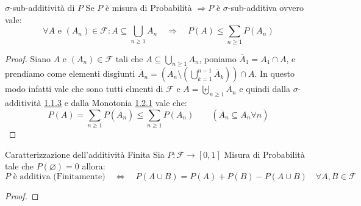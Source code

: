 \documentclass[11pt, a4paper, twoside]{article}
\begin{document}
\begin{prop}{$\sigma$-sub-additività di $P$}{}
	Se $P$ è misura di Probabilità	$\Rightarrow P$ è $\sigma$-sub-additiva ovvero vale:
	\[
		\forall A \text{ e } (A_n)\in\mathcal F : A\subseteq \bigcup\limits_{n\geq 1} A_n\quad\Rightarrow\quad P(A)\leq \sum\limits_{n\geq 1} P(A_n)
	\]
\end{prop}
\begin{proof}
	Siano $A$ e $(A_n)\in\mathcal F$ tali che $A\subseteq \bigcup\limits_{n\geq 1} A_n$, poniamo $\overline{A}_1= A_1\cap A$, e prendiamo come elementi disgiunti $\overline{A}_n=\left(A_n\setminus\left(\bigcup\limits_{k=1}^{n-1} \overline{A}_k\right)\right)\cap A$. In questo modo infatti vale che sono tutti elmenti di $\mathcal F$ e $A=\biguplus\limits_{n\geq1} \overline{A}_n$ e quindi dalla $\sigma$-additività \hyperref[Misura]{1.1.3}  e dalla Monotonia \hyperref[Monotonia]{1.2.1} vale che:
	\[
		P(A)=\sum\limits_{n\geq 1} P(\overline{A}_n)\leq \sum\limits_{n\geq 1} P(A_n)\qquad \left(\overline{A}_n\subseteq A_n \forall n\right)
	\]
\end{proof}

\begin{prop}{Caratterizzazione dell'additività Finita}{}
	Sia $P : \mathcal F\rightarrow [0,1]$ Misura di Probabilità tale che $P(\varnothing)=0$ allora:
	\[
		P \text{ è additiva (Finitamente)}\quad \iff\quad P(A\cup B)=P(A)+P(B)-P(A\cup B) \quad \forall A,B\in \mathcal F
	\]
\end{prop}
\begin{proof}
\end{proof}
\end{document}
